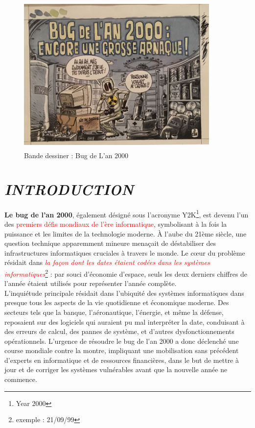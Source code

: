 \documentclass[12pt,a4paper]{article}
\begin{document}
\begin{figure}[H]
    \centering
    \includegraphics[width=10cm, height=8cm]{./images/bug1.jpg}
    \caption{Bande dessiner : Bug de L'an 2000}
\end{figure}

\newpage
\section{\textit{INTRODUCTION}}
\textbf{Le bug de l'an 2000}, également désigné sous l'acronyme Y2K\footnote{Year 2000}\cite{wik}, est devenu l'un des \textcolor{red}{premiers défis mondiaux de l'ère informatique}, symbolisant à la fois la puissance et les limites de la technologie moderne. À l'aube du 21ème siècle, une question technique apparemment mineure menaçait de déstabiliser des infrastructures informatiques cruciales à travers le monde. Le cœur du problème résidait dans \textit{\textcolor{red}{la façon dont les dates étaient codées dans les systèmes informatiques}}\footnote{exemple : 21/09/99} : par souci d'économie d'espace, seuls les deux derniers chiffres de l'année étaient utilisés pour représenter l'année complète.  \\


L'inquiétude principale résidait dans l'ubiquité des systèmes informatiques dans presque tous les aspects de la vie quotidienne et économique moderne. Des secteurs tels que la banque, l'aéronautique, l'énergie, et même la défense, reposaient sur des logiciels qui auraient pu mal interpréter la date, conduisant à des erreurs de calcul, des pannes de système, et d'autres dysfonctionnements opérationnels. L'urgence de résoudre le bug de l'an 2000 a donc déclenché une course mondiale contre la montre, impliquant une mobilisation sans précédent d'experts en informatique et de ressources financières, dans le but de mettre à jour et de corriger les systèmes vulnérables avant que la nouvelle année ne commence.
\end{document}
